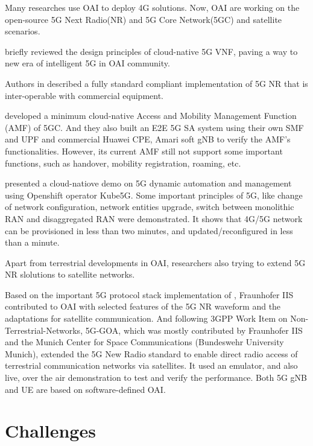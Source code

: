 \documentclass[12pt, draftclsnofoot, onecolumn]{IEEEtran}
\begin{document}
Many researches use OAI to deploy 4G solutions\cite{nikaein2014openairinterface}\cite{powder}\cite{chun2016performance}. Now, OAI are working on the open-source 5G Next Radio(NR) and 5G Core Network(5GC)\cite{kaltenberger2020openairinterface} and satellite scenarios.

\cite{imadali2018cloud} briefly reviewed the design principles of cloud-native 5G VNF, paving a way to new era of intelligent 5G in OAI community.

Authors in \cite{kaltenberger2019openairinterface} described a fully standard compliant implementation of 5G NR that is inter-operable with commercial equipment.


\cite{du2020cloud} developed a minimum cloud-native Access and Mobility Management Function (AMF) of 5GC. And they also built an E2E 5G SA system using their own SMF and UPF and commercial Huawei CPE, Amari soft gNB to verify the AMF’s functionalities. However, its current AMF still not support some important functions, such as handover, mobility registration, roaming, etc.


\cite{arouk20205g} presented a cloud-natiove demo on 5G dynamic automation and management using Openshift operator Kube5G\cite{arouk2020kube5g}. Some important principles of 5G, like change of network configuration, network entities upgrade, switch between monolithic RAN and disaggregated RAN were demonstrated. It shows that 4G/5G network can be provisioned in less than two minutes, and updated/reconfigured in less than a minute. 

Apart from terrestrial developments in OAI, researchers also trying to extend 5G NR slolutions to satellite networks.

Based on the important 5G protocol stack implementation of \cite{allstar}\cite{champion}, Fraunhofer IIS contributed to OAI with selected features of the 5G NR waveform and the adaptations for satellite communication. And following 3GPP Work Item on Non-Terrestrial-Networks\cite{811}\cite{821}, 5G-GOA\cite{GOA}, which was mostly contributed by Fraunhofer IIS and the Munich Center for Space Communications (Bundeswehr University Munich), extended the 5G New Radio standard to enable direct radio access of terrestrial communication networks via satellites. It used an emulator, and also live, over the air demonstration\cite{kaltenbergerbuilding} to test and verify the performance. Both 5G gNB and UE are based on software-defined OAI. 


\section{Challenges}
\end{document}
